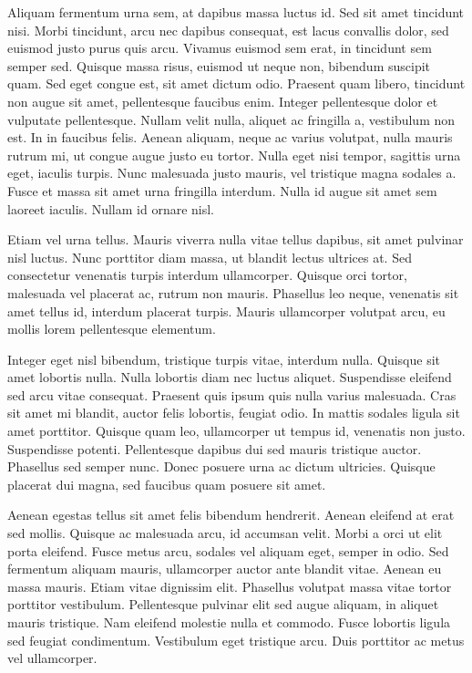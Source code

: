 \documentclass[journal]{IEEEtran}
\begin{document}
Aliquam fermentum urna sem, at dapibus massa luctus id. Sed sit amet tincidunt nisi. Morbi tincidunt, arcu nec dapibus consequat, est lacus convallis dolor, sed euismod justo purus quis arcu. Vivamus euismod sem erat, in tincidunt sem semper sed. Quisque massa risus, euismod ut neque non, bibendum suscipit quam. Sed eget congue est, sit amet dictum odio. Praesent quam libero, tincidunt non augue sit amet, pellentesque faucibus enim. Integer pellentesque dolor et vulputate pellentesque. Nullam velit nulla, aliquet ac fringilla a, vestibulum non est. In in faucibus felis. Aenean aliquam, neque ac varius volutpat, nulla mauris rutrum mi, ut congue augue justo eu tortor. Nulla eget nisi tempor, sagittis urna eget, iaculis turpis. Nunc malesuada justo mauris, vel tristique magna sodales a. Fusce et massa sit amet urna fringilla interdum. Nulla id augue sit amet sem laoreet iaculis. Nullam id ornare nisl.

Etiam vel urna tellus. Mauris viverra nulla vitae tellus dapibus, sit amet pulvinar nisl luctus. Nunc porttitor diam massa, ut blandit lectus ultrices at. Sed consectetur venenatis turpis interdum ullamcorper. Quisque orci tortor, malesuada vel placerat ac, rutrum non mauris. Phasellus leo neque, venenatis sit amet tellus id, interdum placerat turpis. Mauris ullamcorper volutpat arcu, eu mollis lorem pellentesque elementum.

Integer eget nisl bibendum, tristique turpis vitae, interdum nulla. Quisque sit amet lobortis nulla. Nulla lobortis diam nec luctus aliquet. Suspendisse eleifend sed arcu vitae consequat. Praesent quis ipsum quis nulla varius malesuada. Cras sit amet mi blandit, auctor felis lobortis, feugiat odio. In mattis sodales ligula sit amet porttitor. Quisque quam leo, ullamcorper ut tempus id, venenatis non justo. Suspendisse potenti. Pellentesque dapibus dui sed mauris tristique auctor. Phasellus sed semper nunc. Donec posuere urna ac dictum ultricies. Quisque placerat dui magna, sed faucibus quam posuere sit amet.

Aenean egestas tellus sit amet felis bibendum hendrerit. Aenean eleifend at erat sed mollis. Quisque ac malesuada arcu, id accumsan velit. Morbi a orci ut elit porta eleifend. Fusce metus arcu, sodales vel aliquam eget, semper in odio. Sed fermentum aliquam mauris, ullamcorper auctor ante blandit vitae. Aenean eu massa mauris. Etiam vitae dignissim elit. Phasellus volutpat massa vitae tortor porttitor vestibulum. Pellentesque pulvinar elit sed augue aliquam, in aliquet mauris tristique. Nam eleifend molestie nulla et commodo. Fusce lobortis ligula sed feugiat condimentum. Vestibulum eget tristique arcu. Duis porttitor ac metus vel ullamcorper.
\end{document}
